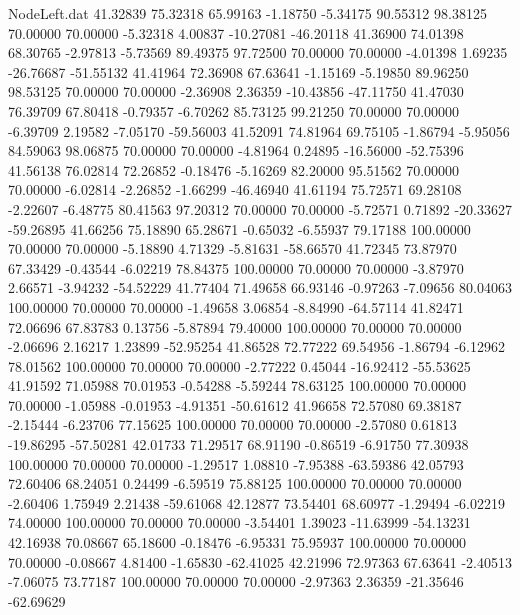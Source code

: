 \begin{filecontents}{NodeLeft.dat}
  41.32839   75.32318   65.99163    -1.18750   -5.34175   90.55312   98.38125   70.00000   70.00000   -5.32318    4.00837  -10.27081  -46.20118
  41.36900   74.01398   68.30765    -2.97813   -5.73569   89.49375   97.72500   70.00000   70.00000   -4.01398    1.69235  -26.76687  -51.55132
  41.41964   72.36908   67.63641    -1.15169   -5.19850   89.96250   98.53125   70.00000   70.00000   -2.36908    2.36359  -10.43856  -47.11750
  41.47030   76.39709   67.80418    -0.79357   -6.70262   85.73125   99.21250   70.00000   70.00000   -6.39709    2.19582   -7.05170  -59.56003
  41.52091   74.81964   69.75105    -1.86794   -5.95056   84.59063   98.06875   70.00000   70.00000   -4.81964    0.24895  -16.56000  -52.75396
  41.56138   76.02814   72.26852    -0.18476   -5.16269   82.20000   95.51562   70.00000   70.00000   -6.02814   -2.26852   -1.66299  -46.46940
  41.61194   75.72571   69.28108    -2.22607   -6.48775   80.41563   97.20312   70.00000   70.00000   -5.72571    0.71892  -20.33627  -59.26895
  41.66256   75.18890   65.28671    -0.65032   -6.55937   79.17188  100.00000   70.00000   70.00000   -5.18890    4.71329   -5.81631  -58.66570
  41.72345   73.87970   67.33429    -0.43544   -6.02219   78.84375  100.00000   70.00000   70.00000   -3.87970    2.66571   -3.94232  -54.52229
  41.77404   71.49658   66.93146    -0.97263   -7.09656   80.04063  100.00000   70.00000   70.00000   -1.49658    3.06854   -8.84990  -64.57114
  41.82471   72.06696   67.83783     0.13756   -5.87894   79.40000  100.00000   70.00000   70.00000   -2.06696    2.16217    1.23899  -52.95254
  41.86528   72.77222   69.54956    -1.86794   -6.12962   78.01562  100.00000   70.00000   70.00000   -2.77222    0.45044  -16.92412  -55.53625
  41.91592   71.05988   70.01953    -0.54288   -5.59244   78.63125  100.00000   70.00000   70.00000   -1.05988   -0.01953   -4.91351  -50.61612
  41.96658   72.57080   69.38187    -2.15444   -6.23706   77.15625  100.00000   70.00000   70.00000   -2.57080    0.61813  -19.86295  -57.50281
  42.01733   71.29517   68.91190    -0.86519   -6.91750   77.30938  100.00000   70.00000   70.00000   -1.29517    1.08810   -7.95388  -63.59386
  42.05793   72.60406   68.24051     0.24499   -6.59519   75.88125  100.00000   70.00000   70.00000   -2.60406    1.75949    2.21438  -59.61068
  42.12877   73.54401   68.60977    -1.29494   -6.02219   74.00000  100.00000   70.00000   70.00000   -3.54401    1.39023  -11.63999  -54.13231
  42.16938   70.08667   65.18600    -0.18476   -6.95331   75.95937  100.00000   70.00000   70.00000   -0.08667    4.81400   -1.65830  -62.41025
  42.21996   72.97363   67.63641    -2.40513   -7.06075   73.77187  100.00000   70.00000   70.00000   -2.97363    2.36359  -21.35646  -62.69629

\end{filecontents}
